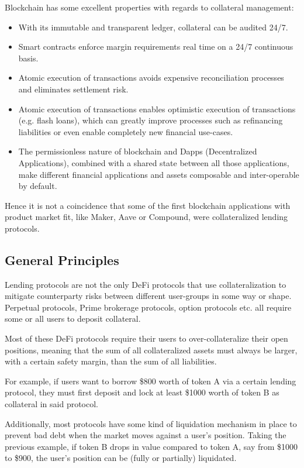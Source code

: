 \documentclass[sigconf,nonacm]{acmart}
\begin{document}
Blockchain has some excellent properties with regards to collateral management:
\begin{itemize}
    \item With its immutable and transparent ledger, collateral can be audited 24/7.
    \item Smart contracts enforce margin requirements real time on a 24/7 continuous basis.
    \item Atomic execution of transactions avoids expensive reconciliation processes and eliminates settlement risk.
    \item Atomic execution of transactions enables optimistic execution of transactions (e.g. flash loans),
    which can greatly improve processes such as refinancing liabilities or even enable completely new financial use-cases.
    \item The permissionless nature of blockchain and Dapps (Decentralized Applications),
    combined with a shared state between all those applications,
    make different financial applications and assets composable and inter-operable by default.
\end{itemize}

Hence it is not a coincidence that some of the first blockchain applications with product market fit, 
like Maker\cite{team2017dai}, Aave\cite{thornburg2020aave} or Compound\cite{leshner2019compound},
were collateralized lending protocols.

\subsection{General Principles}
Lending protocols are not the only DeFi protocols that use collateralization to mitigate counterparty risks between different user-groups in some way or shape.
Perpetual protocols, Prime brokerage protocols, option protocols etc. all require some or all users to deposit collateral.

Most of these DeFi protocols require their users to over-collateralize their open positions,
meaning that the sum of all collateralized assets must always be larger, with a certain safety margin,
than the sum of all liabilities.

For example, if users want to borrow \$800 worth of token A via a certain lending protocol,
they must first deposit and lock at least \$1000 worth of token B as collateral in said protocol.

Additionally, most protocols have some kind of liquidation mechanism in place to prevent bad debt when the market moves against a user's position.
Taking the previous example, if token B drops in value compared to token A, say from \$1000 to \$900,
the user's position can be (fully or partially) liquidated.
\end{document}
